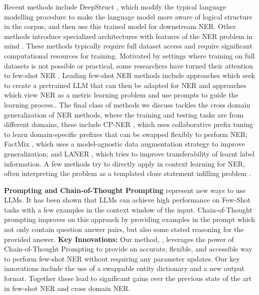 \documentclass[11pt]{article}
\begin{document}
Recent methods include DeepStruct \citep{wang2022deepstruct},
which modify the typical language modelling procedure 
to make the language model more aware of logical structure in the corpus, 
and then use this trained model for downstream NER. 
Other methods introduce specialized architectures 
with features of the NER problem in mind \citep{yu2020named, li2022unified}.
These methods typically require full dataset access 
and require significant computational resources for training.
Motivated by settings where training on full datasets 
is not possible or practical, some researchers have 
turned their attention to few-shot NER
\citep{church2021emerging, das2022container, huang2022copner}.
Leading few-shot NER methods include approaches which seek to create a pretrained LLM that can then be adapted for NER \citep{wang2022deepstruct, xu2022clozing} and approaches which view NER as a metric learning problem and use prompts to guide the learning process.\citep{huang-etal-2022-copner, chen2022prompt}. The final class of methods we discuss 
tackles the cross domain generalization of NER methods, 
where the training and testing tasks are from different domains, 
these include CP-NER \citep{chen2023one},
which uses collaborative prefix tuning
to learn domain-specific prefixes that can be swapped flexibly to perform NER; 
FactMix \citep{yang2022factmix},
which uses a model-agnostic data augmentation strategy
to improve generalization;
and LANER \citep{hu2022label}, 
which tries to improve transferability of learnt label information.
A few methods try to directly apply in context learning \citep{wei2021finetuned} for NER, 
often interpreting the problem as 
a templated cloze statement infilling problem \citep{lee2021good, cui2021template}. 




 \noindent\textbf{Prompting and Chain-of-Thought Prompting} \citep{brown2020language, wei2022chain} 
 represent new ways to use LLMs.
 It has been shown that LLMs can achieve high performance 
 on Few-Shot tasks with a few examples in the context window of the input.
 Chain-of-Thought prompting improves on this approach 
 by providing examples in the prompt 
 which not only contain question answer pairs,
 but also some stated reasoning for the provided answer. 
\textbf{Key Innovations: } Our method, \toolname, 
leverages the power of Chain-of-Thought Prompting
to provide an accurate, flexible, and accessible way 
to perform few-shot NER without requiring 
any parameter updates. 
Our key innovations include the use of
a swappable entity dictionary 
and a new output format.
Together these lead to significant gains 
over the previous state of the art 
in few-shot NER and cross domain NER. 
\end{document}

